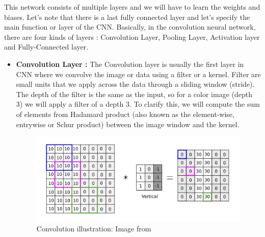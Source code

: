 \documentclass[a4paper]{article}
\begin{document}
This network consists of multiple layers and we will have to learn the weights and biases.
Let's note that there is a last fully connected layer and let's specify the main function or layer of the CNN.
Basically, in the convolution neural network, there are four kinds of layers : Convolution Layer, Pooling Layer, Activation layer and Fully-Connected layer. 
\begin{itemize}
    \item{\textbf{ Convolution Layer :} The Convolution layer is usually the first layer in CNN where we convolve the image or data using a filter or a kernel. Filter are small units that we apply across the data  through a sliding window (stride). The depth of the filter is the same as the input, so for a color image (depth 3) we will apply a filter of a depth 3. 
    To clarify this, we will compute the sum of elements from Hadamard product (also known as the element-wise, entrywise or Schur product) between the image window and the kernel.  }
    
    \begin{figure}[H]
      \includegraphics[width=\linewidth]{images/edge-detection-vertical.png}
      \caption{Convolution illustration: Image from \cite{cnnAnh}}
      \label{fig:boat1}
    \end{figure}
    

\end{itemize}
\end{document}
